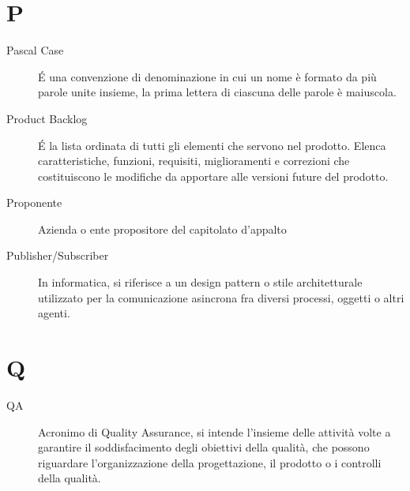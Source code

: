 \documentclass[a4paper, oneside]{article}
\begin{document}
\section{P}
\begin{description}
  \item[Pascal Case] É una convenzione di denominazione in cui un nome è formato da più parole unite insieme, la prima lettera di ciascuna delle parole è maiuscola.
  \item[Product Backlog] É la lista ordinata di tutti gli elementi che servono nel prodotto. Elenca caratteristiche, funzioni, requisiti, miglioramenti e correzioni che costituiscono le modifiche da apportare alle versioni future del prodotto.
  \item[Proponente] Azienda o ente propositore del capitolato d'appalto
  \item[Publisher/Subscriber] In informatica, si riferisce a un design pattern o stile architetturale utilizzato per la comunicazione asincrona fra diversi processi, oggetti o altri agenti.
\end{description}
\newpage
\section{Q}
\begin{description}
  \item[QA] Acronimo di Quality Assurance, si intende l'insieme delle attività volte a garantire il soddisfacimento degli obiettivi della qualità, che possono riguardare l'organizzazione della progettazione, il prodotto o i controlli della qualità.
\end{description}
\newpage
\end{document}
